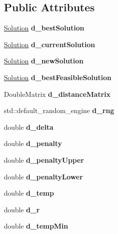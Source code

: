 \subsection*{Public Attributes}
\begin{DoxyCompactItemize}
\item 
\mbox{\label{class_env_a200b43f8ef6487fd256326a549616e78}} 
\hyperlink{class_solution}{Solution} {\bfseries d\+\_\+best\+Solution}
\item 
\mbox{\label{class_env_a60f53202173a69954e643ef46f16062f}} 
\hyperlink{class_solution}{Solution} {\bfseries d\+\_\+current\+Solution}
\item 
\mbox{\label{class_env_a6109a75656bf4b55567e57369d7b5aa5}} 
\hyperlink{class_solution}{Solution} {\bfseries d\+\_\+new\+Solution}
\item 
\mbox{\label{class_env_a639c27f323c898cb9821f4c64b1a055a}} 
\hyperlink{class_solution}{Solution} {\bfseries d\+\_\+best\+Feasible\+Solution}
\item 
\mbox{\label{class_env_a2686d42335dbafb9c10ebdbe6362e613}} 
Double\+Matrix {\bfseries d\+\_\+distance\+Matrix}
\item 
\mbox{\label{class_env_acde21783d6aed785a78cf914a7215383}} 
std\+::default\+\_\+random\+\_\+engine {\bfseries d\+\_\+rng}
\item 
\mbox{\label{class_env_a356dd226bf831c283818b459d66224c4}} 
double {\bfseries d\+\_\+delta}
\item 
\mbox{\label{class_env_a75f5662133f2d29d710c2bf2e2a34229}} 
double {\bfseries d\+\_\+penalty}
\item 
\mbox{\label{class_env_aa6ed2cae83f5d2e6ef14235fad4e050b}} 
double {\bfseries d\+\_\+penalty\+Upper}
\item 
\mbox{\label{class_env_a0524d57e12d574d482af272ce82c95ec}} 
double {\bfseries d\+\_\+penalty\+Lower}
\item 
\mbox{\label{class_env_a629686cbb29294979039c2adb9f19f66}} 
double {\bfseries d\+\_\+temp}
\item 
\mbox{\label{class_env_a8642169aafd7eca86c9ecdcccfdb12f2}} 
double {\bfseries d\+\_\+r}
\item 
\mbox{\label{class_env_a67d0d9d6323ec31b3fa226856afaf93e}} 
double {\bfseries d\+\_\+temp\+Min}
\end{DoxyCompactItemize}


